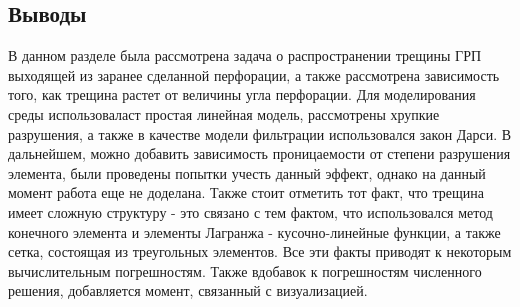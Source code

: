 \subsection*{Выводы}

В данном разделе была рассмотрена задача о распространении трещины ГРП выходящей из заранее сделанной перфорации, а также рассмотрена зависимость того, как трещина растет от величины угла перфорации. Для моделирования среды использоваласт простая линейная модель, рассмотрены хрупкие разрушения, а также в качестве модели фильтрации использовался закон Дарси. \newpage В дальнейшем, можно добавить зависимость проницаемости от степени разрушения элемента, были проведены попытки учесть данный эффект, однако на данный момент работа еще не доделана. Также стоит отметить тот факт, что трещина имеет сложную структуру - это связано с тем фактом, что использовался метод конечного элемента и элементы Лагранжа - кусочно-линейные функции, а также сетка, состоящая из треугольных элементов. Все эти факты приводят к некоторым вычислительным погрешностям. Также вдобавок к погрешностям численного решения, добавляется момент, связанный с визуализацией. 




% 
% 


% 
% 
% 

% 
% 